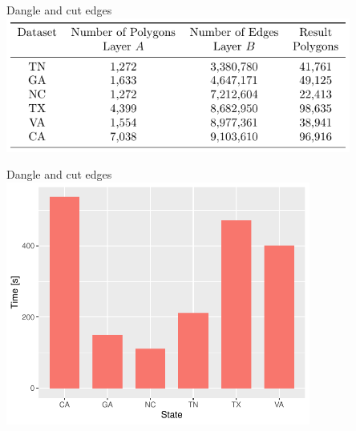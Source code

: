 \begin{frame}{Dangle and cut edges}
    \centering
    \includegraphics[width=0.85\textwidth]{figures/dangles_datasets}
\end{frame}

\begin{frame}{Dangle and cut edges}
    \centering
    \includegraphics[width=0.75\textwidth]{../thesis/chapterExtension/states}
\end{frame}
